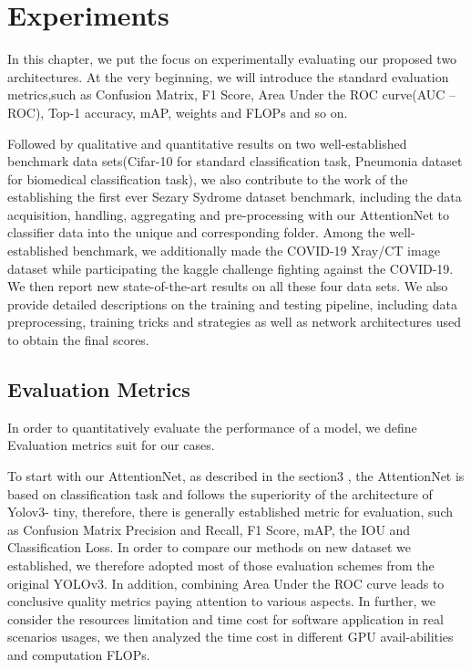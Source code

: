 































\chapter{Experiments}
\label{sec:examples}
In this chapter, we put the focus on experimentally evaluating our proposed two architectures. At the very beginning, we will introduce the standard evaluation metrics,such as Confusion Matrix, F1 Score, Area Under the ROC curve(AUC – ROC), Top-1 accuracy, mAP,  weights and FLOPs and so on. 

Followed by qualitative and quantitative results on two well-established benchmark data sets(Cifar-10 for standard classification task, Pneumonia dataset for biomedical classification task), we also contribute to the work of the establishing the first ever Sezary Sydrome dataset benchmark, including the data acquisition, handling, aggregating and pre-processing with our AttentionNet to classifier data into the unique and corresponding folder. Among the well-established benchmark, we additionally made the COVID-19 Xray/CT image dataset while participating the kaggle challenge fighting against the COVID-19. We then report new state-of-the-art results on all these four data sets. We also  provide detailed descriptions on the training and testing pipeline, including data preprocessing, training tricks and strategies as well as network architectures used to obtain the final scores.

\section{Evaluation Metrics}
\label{sec:lorem}
In order to quantitatively evaluate the performance of a model, we define Evaluation metrics suit for our cases.

To start with  our AttentionNet,  as described in the section3 , the AttentionNet  is  based on classification task and follows the superiority of the architecture of Yolov3- tiny, therefore, there is  generally established metric for evaluation, such as Confusion Matrix Precision and Recall, F1 Score, mAP,  the IOU and  Classification Loss. In order  to compare our methods on new dataset we established, we therefore adopted most of those evaluation schemes from the original YOLOv3. In addition, combining Area Under the ROC curve leads to conclusive quality metrics paying attention to various aspects. 
In further, we consider the resources limitation and time cost for software application in real scenarios usages, we then analyzed  the time cost in different GPU avail-abilities and computation FLOPs.


